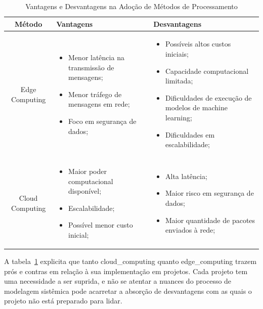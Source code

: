\begin{table}[H] 
    \centering     
    \caption{Vantagens e Desvantagens na Adoção de Métodos de Processamento}
    \label{tab:vant_desvant_edge_cloud}
    \begin{tabular}{|c|p{6cm}|p{6cm}|} 
    \hline 
    \textbf{Método} & \textbf{Vantagens} & \textbf{Desvantagens} \\ 
    \hline 
        Edge Computing & 
        \begin{itemize}
            \item Menor latência na transmissão de mensagens;
            \item Menor tráfego de mensagens em rede;
            \item Foco em segurança de dados;
        \end{itemize} 
        & 
        \begin{itemize}
            \item Possíveis altos custos iniciais;
            \item Capacidade computacional limitada;
            \item Dificuldades de execução de modelos de machine learning;
            \item Dificuldades em escalabilidade;
        \end{itemize} \\ \hline 
        Cloud Computing & 
        \begin{itemize}
            \item Maior poder computacional disponível;
            \item Escalabilidade;
            \item Possível menor custo inicial;     
        \end{itemize}
        & 
        \begin{itemize}
            \item Alta latência;
            \item Maior risco em segurança de dados;
            \item Maior quantidade de pacotes enviados à rede; 
        \end{itemize} \\ \hline 
    \end{tabular} 

\end{table} 

A tabela~\ref{tab:vant_desvant_edge_cloud} 
explicita que tanto \gls{cloud_computing} quanto \gls{edge_computing} 
trazem prós e contras em relação à sua implementação em projetos. 
Cada projeto tem uma necessidade a ser suprida, e não se atentar a nuances 
do processo de modelagem sistêmica pode acarretar a absorção de desvantagens com as quais 
o projeto não está preparado para lidar.
